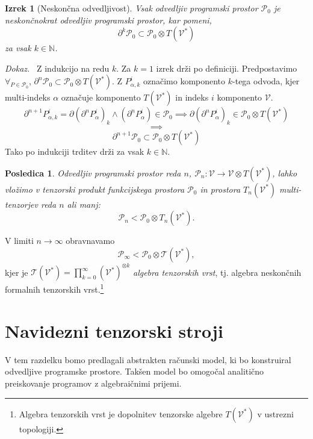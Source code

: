 \documentclass[a4paper, 12pt]{book}
\newcommand{\T}{\mathcal{T}}
\newcommand{\VV}{\mathcal{V}}
\newcommand{\dP}{\mathcal{P}}
\newcommand{\D}{\partial}
\newtheorem{posledica}{Posledica}[chapter]
\newtheorem{izrek}{Izrek}[chapter]
\newenvironment{dokaz}{\emph{Dokaz.}\ }{\hspace{\fill}{$\Box$}}
\begin{document}
\begin{izrek}[Neskončna odvedljivost]\label{thm:infDif}
Vsak odvedljiv programski prostor $\dP_0$ je \emph{neskončnokrat odvedljiv programski prostor}, kar pomeni,
\begin{equation}\label{eq:P_n}
	 		\D^k\dP_0\subset\dP_0\otimes T(\VV^*)
	 	\end{equation}
za vsak $k\in\mathbb{N}$.
\end{izrek}
\begin{dokaz}
Z indukcijo na redu $k$. Za $k=1$ izrek drži po definiciji. Predpostavimo $\forall_{P\in\dP_0}$,
  $\D^n\dP_0\subset\dP_0\otimes T(\VV^*)$. Z $P_{\alpha,k}^i$ označimo komponento $k$-tega odvoda, kjer multi-indeks $\alpha$ označuje komponento $T(\VV^*)$ in indeks $i$ komponento $\VV$.
	\begin{equation}\label{eq:inductionStep}
\D^{n+1}P_{\alpha,k}^i=\D(\D^n P^i_\alpha)_k\land(\D^n P^i_\alpha)\in\dP_0\implies \D(\D^n P^i_\alpha)_k\in \dP_0\otimes T(\VV^*)
	\end{equation}
	$$\implies$$
	$$\D^{n+1}\dP_0\subset\dP_0\otimes T(\VV^*)$$
Tako po indukciji trditev drži za vsak $k\in\mathbb{N}$.
\end{dokaz}
\begin{posledica}\label{tenProdEmb}
Odvedljiv programski prostor reda $n$, $\dP_n:\VV\to\VV\otimes T(\VV^*)$, lahko vložimo v tenzorski produkt funkcijskega prostora $\dP_0$ in prostora $T_n(\VV^*)$ multi-tenzorjev reda $n$ ali manj:
\begin{equation}
    \label{eq:D_p_embed}
    \dP_n<\dP_0\otimes T_n(\VV^*).
  \end{equation}
\end{posledica}

V limiti $n\to\infty$ obravnavamo
\begin{equation}
 	\label{eq:P_algebra}
 	 	    \dP_\infty < \dP_0\otimes \T(\VV^*),
 	\end{equation}
kjer je $\T(\VV^*)=\prod_{k=0}^\infty (\VV^*)^{\otimes k}$ \emph{algebra tenzorskih vrst}, tj. algebra neskončnih formalnih tenzorskih vrst.\footnote{Algebra tenzorskih vrst je dopolnitev tenzorske algebre $T(\VV^*)$ v ustrezni topologiji.}

\section{Navidezni tenzorski stroji}

V tem razdelku bomo predlagali abstrakten računski model, ki bo konstruiral odvedljive programske prostore. Takšen model bo omogočal analitično preiskovanje programov z algebraičnimi prijemi.
\end{document}
